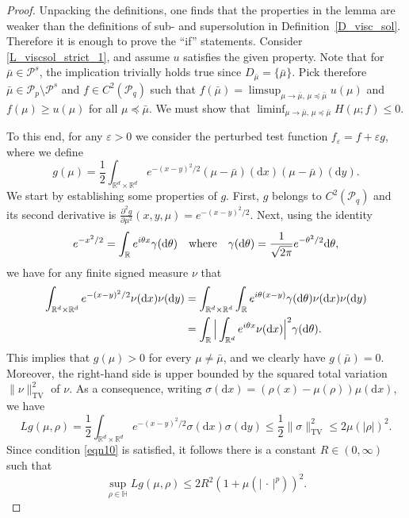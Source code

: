 \documentclass{article}
\theoremstyle{definition}
\numberwithin{equation}{section}
\numberwithin{theorem}{section}
\newcommand{\R}{\mathbb{R}}
\newcommand{\dx}{\mathrm{d}x}
\newcommand{\dy}{\mathrm{d}y}
\newcommand{\Hb}{\mathbb{H}}
\renewcommand{\r}{R}
\renewcommand{\d}{{\rm d}}
\newcommand{\Pcal}{{\mathcal P}}
\newcommand{\fdot}{{\,\cdot\,}}
\begin{document}
\begin{proof}
Unpacking the definitions, one finds that the properties in the lemma are weaker than the definitions of sub- and supersolution in Definition~\ref{D_visc_sol}. Therefore it is enough to prove the ``if'' statements. Consider \ref{L_viscsol_strict_1}, and assume $u$ satisfies the given property.
Note that for $\bar\mu\in\Pcal^s$, the implication trivially holds true since $D_{\bar\mu}=\{\bar\mu\}$.
Pick therefore $\bar\mu\in\Pcal_p\setminus\Pcal^s$ and $f\in C^2(\Pcal_q)$ such that $f(\bar\mu)=\limsup_{\mu\to\bar\mu,\,\mu\preceq\bar\mu}u(\mu)$ and $f(\mu)\ge u(\mu)$ for all $\mu\preceq\bar\mu$. We must show that $\liminf_{\mu\to\bar\mu,\, \mu\preceq\bar\mu} H(\mu;f) \le 0$.

To this end, for any $\varepsilon>0$ we consider the perturbed test function $f_\varepsilon = f + \varepsilon g$, where we define
\[
g(\mu) = \frac12 \int_{{\R^d}\times {\R^d}} e^{-(x-y)^2/2} (\mu - \bar\mu)(\dx)(\mu - \bar\mu)(\dy).
\]
We start by establishing some properties of $g$. First, $g$ belongs to $C^2(\Pcal_q)$ and its second derivative is $\frac{\partial^2 g}{\partial \mu^2}(x,y,\mu) = e^{-(x-y)^2/2}$. Next, using the identity
\[
e^{-x^2/2} = \int_\R e^{i\theta x} \gamma(\d \theta) \quad \text{where} \quad \gamma(\d \theta) = \frac{1}{\sqrt{2\pi}}e^{-\theta^2/2} \d \theta,
\]
we have for any finite signed measure $\nu$ that
\begin{align*}
\int_{{\R^d}\times {\R^d}} e^{-(x-y)^2/2} \nu(\dx) \nu(\dy) &= \int_{{\R^d}\times {\R^d}} \int_\R e^{i\theta (x-y)} \gamma(\d \theta) \nu(\dx) \nu(\dy) \\
&= \int_\R \Big| \int_{\R^d} e^{i\theta x} \nu(\dx) \Big|^2 \gamma(\d \theta).
\end{align*}
This implies that $g(\mu) > 0$ for every $\mu \ne \bar \mu$, and we clearly have $g(\bar\mu) = 0$. Moreover, the right-hand side is upper bounded by the squared total variation $\|\nu\|_\text{TV}^2$ of $\nu$. As a consequence, writing $\sigma(\dx) = (\rho(x) - \mu(\rho))\mu(\dx)$, we have
\[
Lg(\mu,\rho) = \frac12 \int_{{\R^d}\times {\R^d}} e^{-(x-y)^2/2} \sigma(\dx) \sigma(\dy) \le \frac12 \| \sigma \|_\text{TV}^2 \le 2 \mu(|\rho|)^2.
\]
Since condition \eqref{eqn10} is satisfied, it follows there is a constant $\r \in (0,\infty)$ such that
\[
\sup_{\rho \in \Hb} Lg(\mu,\rho) \le 2 \r^2 (1 + \mu(|\fdot|^p))^2.
\]


\end{proof}
\end{document}
